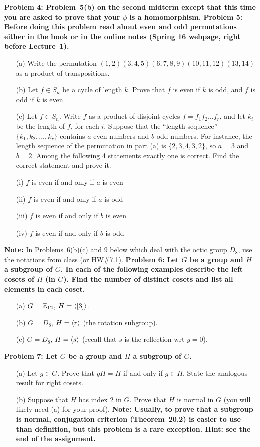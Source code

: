 \documentclass[11pt]{amsart}
\begin{document}
\skv
\bf{Problem 4: }\rm Problem~5(b) on the second midterm except that this time you are asked to prove that your $\phi$ is  
a homomorphism.
\skv
\bf{Problem 5: }\rm Before doing this problem read about even and odd permutations
either in the book or in the online notes (Spring 16 webpage, right before Lecture~1).
\begin{itemize} 
\item[(a)] Write the permutation
$(1,2)(3,4,5)(6,7,8,9)(10,11,12)(13,14)$ as a product of transpositions.
\item[(b)] Let $f\in S_n$ be a cycle of length $k$. Prove that $f$ is even if $k$ is odd,
and $f$ is odd if $k$ is even.
\item[(c)] Let $f\in S_n$. Write $f$ as a product of disjoint cycles $f=f_1 f_2\ldots f_r$, and let $k_i$ be the length of $f_i$ for each $i$. Suppose that the ``length sequence'' $\{k_1, k_2,\ldots, k_r\}$ contains $a$ even numbers and $b$ odd numbers.
For instance, the length sequence of the permutation in part (a) is $\{2,3,4,3,2\}$,
so $a=3$ and $b=2$.
\skv
Among the following 4 statements exactly one is correct. Find the correct statement and prove it.

\sk (i) $f$ is even if and only if $a$ is even

\sk (ii) $f$ is even if and only if $a$ is odd

\sk (iii) $f$ is even if and only if $b$ is even

\sk (iv) $f$ is even if and only if $b$ is odd
\end{itemize}
\skv
{\bf Note:} In Problems~6(b)(c) and 9 below which deal with the octic group $D_8$, use the notations from class (or HW\#7.1).
\skv
\bf{Problem 6: }\rm Let $G$ be a group and $H$ a subgroup of $G$.
In each of the following examples describe the left cosets of $H$ (in $G$). Find the number of distinct cosets
and list all elements in each coset. 
\begin{itemize}
\item[(a)] $G={\mathbb Z}_{12}$, $H={\langle} [3]{\rangle}$.
\item[(b)] $G=D_8$, $H={\langle} r {\rangle}$ (the rotation subgroup).
\item[(c)] $G=D_8$, $H={\langle} s{\rangle}$ (recall that $s$ is the reflection  wrt $y=0$).
\end{itemize}

\skv
\bf{Problem 7: }\rm Let $G$ be a group and $H$ a subgroup of $G$.
\begin{itemize}
\item[(a)] Let $g\in G$. Prove that $gH=H$ if and only if $g\in H$. 
State the analogous result for right cosets.
\item[(b)] Suppose that $H$ has index $2$ in $G$. Prove that $H$ is normal in $G$
(you will likely need (a) for your proof). \bf{Note: }\rm Usually, to prove 
that a subgroup is normal, conjugation criterion (Theorem~20.2) is easier to use 
than definition, but this problem is a rare exception.
\bf{Hint: }\rm see the end of the assignment. 
\end{itemize}
\skv
\end{document}
